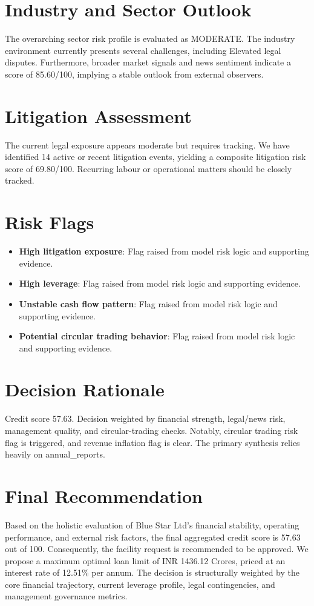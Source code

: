 \documentclass[11pt,a4paper]{article}
\begin{document}
\section*{Industry and Sector Outlook}
The overarching sector risk profile is evaluated as MODERATE. The industry environment currently presents several challenges, including Elevated legal disputes. Furthermore, broader market signals and news sentiment indicate a score of 85.60/100, implying a stable outlook from external observers.

\section*{Litigation Assessment}
The current legal exposure appears moderate but requires tracking. We have identified 14 active or recent litigation events, yielding a composite litigation risk score of 69.80/100. Recurring labour or operational matters should be closely tracked.

\section*{Risk Flags}
\begin{itemize}
\item \textbf{High litigation exposure}: Flag raised from model risk logic and supporting evidence.
\item \textbf{High leverage}: Flag raised from model risk logic and supporting evidence.
\item \textbf{Unstable cash flow pattern}: Flag raised from model risk logic and supporting evidence.
\item \textbf{Potential circular trading behavior}: Flag raised from model risk logic and supporting evidence.
\end{itemize}

\section*{Decision Rationale}
Credit score 57.63. Decision weighted by financial strength, legal/news risk, management quality, and circular-trading checks. Notably, circular trading risk flag is triggered, and revenue inflation flag is clear. The primary synthesis relies heavily on annual\_reports.

\section*{Final Recommendation}
Based on the holistic evaluation of Blue Star Ltd's financial stability, operating performance, and external risk factors, the final aggregated credit score is 57.63 out of 100. Consequently, the facility request is recommended to be approved. We propose a maximum optimal loan limit of INR 1436.12 Crores, priced at an interest rate of 12.51\% per annum. The decision is structurally weighted by the core financial trajectory, current leverage profile, legal contingencies, and management governance metrics.
\end{document}
